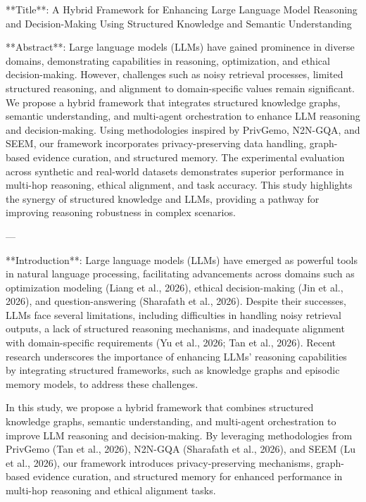 **Title**: A Hybrid Framework for Enhancing Large Language Model Reasoning and Decision-Making Using Structured Knowledge and Semantic Understanding  

**Abstract**:  
Large language models (LLMs) have gained prominence in diverse domains, demonstrating capabilities in reasoning, optimization, and ethical decision-making. However, challenges such as noisy retrieval processes, limited structured reasoning, and alignment to domain-specific values remain significant. We propose a hybrid framework that integrates structured knowledge graphs, semantic understanding, and multi-agent orchestration to enhance LLM reasoning and decision-making. Using methodologies inspired by PrivGemo, N2N-GQA, and SEEM, our framework incorporates privacy-preserving data handling, graph-based evidence curation, and structured memory. The experimental evaluation across synthetic and real-world datasets demonstrates superior performance in multi-hop reasoning, ethical alignment, and task accuracy. This study highlights the synergy of structured knowledge and LLMs, providing a pathway for improving reasoning robustness in complex scenarios.  

---

**Introduction**:  
Large language models (LLMs) have emerged as powerful tools in natural language processing, facilitating advancements across domains such as optimization modeling (Liang et al., 2026), ethical decision-making (Jin et al., 2026), and question-answering (Sharafath et al., 2026). Despite their successes, LLMs face several limitations, including difficulties in handling noisy retrieval outputs, a lack of structured reasoning mechanisms, and inadequate alignment with domain-specific requirements (Yu et al., 2026; Tan et al., 2026). Recent research underscores the importance of enhancing LLMs' reasoning capabilities by integrating structured frameworks, such as knowledge graphs and episodic memory models, to address these challenges.  

In this study, we propose a hybrid framework that combines structured knowledge graphs, semantic understanding, and multi-agent orchestration to improve LLM reasoning and decision-making. By leveraging methodologies from PrivGemo (Tan et al., 2026), N2N-GQA (Sharafath et al., 2026), and SEEM (Lu et al., 2026), our framework introduces privacy-preserving mechanisms, graph-based evidence curation, and structured memory for enhanced performance in multi-hop reasoning and ethical alignment tasks.  

